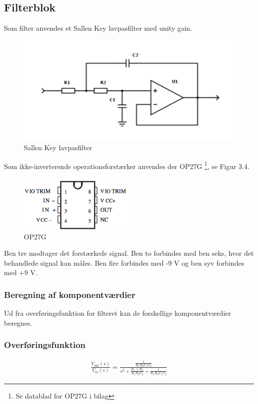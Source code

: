 \subsection{Filterblok}
Som filter anvendes et Sallen Key lavpasfilter med unity gain.

\begin{figure}[H]
	\centering
	\includegraphics[width=1\textwidth]{Figurer/Snip20151117_105}
	\caption{Sallen Key lavpasfilter}
\end{figure}

Som ikke-inverterende operationsforstærker anvendes der OP27G \footnote{Se datablad for OP27G i bilag}, se Figur 3.4. 

\begin{figure}[H]
	\centering
	\includegraphics[width=0.5\textwidth]{Figurer/Snip20151207_49}
	\caption{OP27G}
\end{figure}

Ben tre modtager det forstærkede signal. Ben to forbindes med ben seks, hvor det behandlede signal kan måles. Ben fire forbindes med -9 V og ben syv forbindes med +9 V.  


\subsubsection{Beregning af komponentværdier}
Ud fra overføringsfunktion for filteret kan de forskellige komponentværdier beregnes. 

\subsubsection{Overføringsfunktion}
\begin{align}
	\frac{V_{out}(s)}{V_{in}(s)}=\frac{\frac{1}{R_1R_2C_1C_2}}{s^2+\frac{R_1+R_2}{R_1R_2C_2}+\frac{1}{R_1R_2C_1C_2}}
\end{align}

